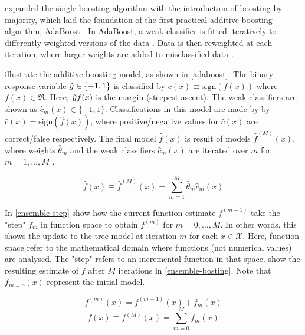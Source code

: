 \textcite{freund-boosting-by-majority} expanded the single boosting algorithm with the introduction of boosting by majority, which laid the foundation of the first practical additive boosting algorithm, AdaBoost \parencite{freund-ada-boost}. In AdaBoost, a weak classifier is fitted iteratively to differently weighted versions of the data \parencite{freund-ada-boost}. Data is then reweighted at each iteration, where larger weights are added to misclassified data \parencite{freund-ada-boost}. 

\textcite{ntnu-thesis-why-does-xgboost-win-every-machine-learning-competition} illustrate the additive boosting model, as shown in \autoref{adaboost}. The binary response variable $\Tilde{y}\in\{-1,1\}$ is classified by $c(x)\equiv\text{sign}(f(x))$ where $f(x)\in \Re$. Here, $\Tilde{y}f(x)$ is the margin (steepest ascent). The weak classifiers are shown as $\hat{c}_m(x)\in{\{-1,1\}}$. Classifications in this model are made by by $\hat{c}(x)=\text{sign}(\hat{f}(x))$, where positive/negative values for $\hat{c}(x)$ are correct/false respectively. The final model $\hat{f}(x)$ is result of models $\hat{f}^{(M)}(x)$, where weights $\hat{\theta}_m$ and the weak classifiers $\hat{c}_m(x)$ are iterated over $m$ for $m=1,\dots,M$ \parencite{ntnu-thesis-why-does-xgboost-win-every-machine-learning-competition}. 

\begin{equation}
\label{adaboost}
    \hat{f}(x)\equiv\hat{f}^{(M)}(x)=\sum_{m=1}^{M}\hat{\theta}_m\hat{c}_m(x)
\end{equation}

In \autoref{ensemble-step} \textcite{ntnu-thesis-why-does-xgboost-win-every-machine-learning-competition} show how the current function estimate $f^{(m-1)}$ take the "step" $f_m$ in function space to obtain $f^{(m)}$ for $m=0,\dots,M$. In other words, this shows the update to the tree model at iteration $m$ for each $x\in \mathcal{X}$. Here, function space refer to the mathematical domain where functions (not numerical values) are analysed. The "step" refers to an incremental function in that space. \textcite{ntnu-thesis-why-does-xgboost-win-every-machine-learning-competition} show the resulting estimate of $f$ after $M$ iterations in \autoref{ensemble-bosting}. Note that $f_{m=o}(x)$ represent the initial model. 

\vspace{-1em}
\begin{equation}
\label{ensemble-step}
    f^{(m)}(x)=f^{(m-1)}(x)+f_m(x)
\end{equation}
\begin{equation}
\label{ensemble-bosting}
    f(x)\equiv f^{(M)}(x)=\sum_{m=0}^{M}f_m(x)
\end{equation}

